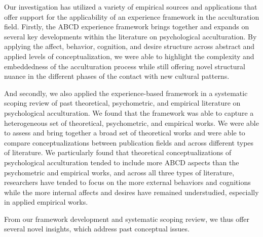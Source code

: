\documentclass[man, 12pt, a4paper, mask]{apa7}
\begin{document}
Our investigation has utilized a variety of empirical sources and applications that offer support for the applicability of an experience framework in the acculturation field. Firstly, the ABCD experience framework brings together and expands on several key developments within the literature on psychological acculturation. By applying the affect, behavior, cognition, and desire structure across abstract and applied levels of conceptualization, we were able to highlight the complexity and embeddedness of the acculturation process while still offering novel structural nuance in the different phases of the contact with new cultural patterns.

And secondly, we also applied the experience-based framework in a systematic scoping review of past theoretical, psychometric, and empirical literature on psychological acculturation.
We found that the framework was able to capture a heterogeneous set of theoretical, psychometric, and empirical works. We were able to assess and bring together a broad set of theoretical works and were able to compare conceptualizations between publication fields and across different types of literature. We particularly found that theoretical conceptualizations of psychological acculturation tended to include more ABCD aspects than the psychometric and empirical works, and across all three types of literature, researchers have tended to focus on the more external behaviors and cognitions while the more internal affects and desires have remained understudied, especially in applied empirical works.
    
From our framework development and systematic scoping review, we thus offer several novel insights, which address past conceptual issues.
\end{document}
